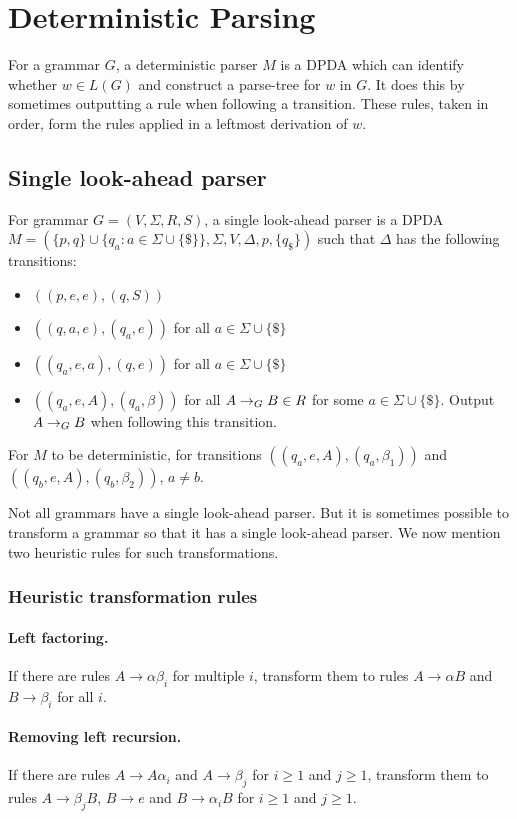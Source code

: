 \section{Deterministic Parsing}

\begin{definition}
For a grammar $G$, a deterministic parser $M$ is a DPDA which can
identify whether $w \in L(G)$ and construct a parse-tree for $w$ in $G$.
It does this by sometimes outputting a rule when following a transition.
These rules, taken in order, form the rules applied in a leftmost derivation of $w$.
\end{definition}

\subsection{Single look-ahead parser}

\begin{definition}
For grammar $G = (V, \Sigma, R, S)$, a single look-ahead parser is a DPDA
$M = (\{p, q\}\cup\{q_a: a \in \Sigma \cup \{\$\}\}, \Sigma, V, \Delta, p, \{q_{\$}\})$
such that $\Delta$ has the following transitions:
\begin{itemize}
\item $((p, e, e), (q, S))$
\item $((q, a, e), (q_a, e))$ for all $a \in \Sigma \cup \{\$\}$
\item $((q_a, e, a), (q, e))$ for all $a \in \Sigma \cup \{\$\}$
\item $((q_a, e, A), (q_a, \beta))$ for all $A \rightarrow_{G} B \in R$ for some $a \in \Sigma \cup \{\$\}$.
    Output $A \rightarrow_{G} B$ when following this transition.
\end{itemize}
For $M$ to be deterministic, for transitions $((q_a, e, A), (q_a, \beta_1))$
and $((q_b, e, A), (q_b, \beta_2))$, $a \neq b$.
\end{definition}

Not all grammars have a single look-ahead parser.
But it is sometimes possible to transform a grammar so that it has a single look-ahead parser.
We now mention two heuristic rules for such transformations.

\subsubsection{Heuristic transformation rules}

\paragraph{Left factoring.}
If there are rules $A \rightarrow \alpha\beta_i$ for multiple $i$,
transform them to rules $A \rightarrow \alpha B$ and $B \rightarrow \beta_i$ for all $i$.

\paragraph{Removing left recursion.}
If there are rules $A \rightarrow A\alpha_i$ and $A \rightarrow \beta_j$
for $i \ge 1$ and $j \ge 1$,
transform them to rules $A \rightarrow \beta_jB$, $B \rightarrow e$ and $B \rightarrow \alpha_iB$
for $i \ge 1$ and $j \ge 1$.


